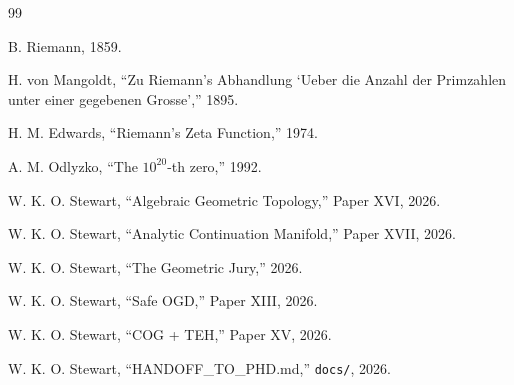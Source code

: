\documentclass[11pt,a4paper]{article}
\begin{document}
\begin{thebibliography}{99}

 B. Riemann, 1859.

 H. von Mangoldt, ``Zu Riemann's Abhandlung `Ueber die Anzahl der Primzahlen unter einer gegebenen Grosse','' 1895.

 H. M. Edwards, ``Riemann's Zeta Function,'' 1974.

 A. M. Odlyzko, ``The $10^{20}$-th zero,'' 1992.

 W. K. O. Stewart, ``Algebraic Geometric Topology,'' Paper XVI, 2026.

 W. K. O. Stewart, ``Analytic Continuation Manifold,'' Paper XVII, 2026.

 W. K. O. Stewart, ``The Geometric Jury,'' 2026.

 W. K. O. Stewart, ``Safe OGD,'' Paper XIII, 2026.

 W. K. O. Stewart, ``COG + TEH,'' Paper XV, 2026.

 W. K. O. Stewart, ``HANDOFF\_TO\_PHD.md,'' \texttt{docs/}, 2026.

\end{thebibliography}
\end{document}
